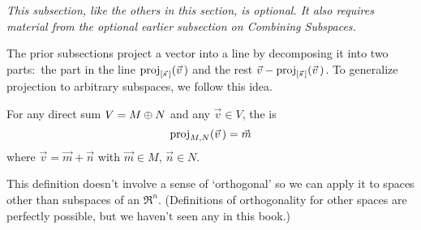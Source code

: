 \noindent\textit{This subsection, like the others in this section,
     is optional.
     It also requires material from the 
     optional earlier subsection on Combining Subspaces.}

The prior subsections
project a vector into a line by decomposing it into two parts:~the
part in the line $\proj{\vec{v}\,}{\spanof{\vec{s}\,}}$ 
and the rest $\vec{v}-\proj{\vec{v}\,}{\spanof{\vec{s}\,}}$.
To generalize projection to arbitrary subspaces, we follow this idea.

\begin{definition}
\label{def:ProjIntoMAlongN}
For any direct sum \( V=M\directsum N \) and any \( \vec{v}\in V \),
the %
is
\begin{equation*}
  \proj{\vec{v}\,}{M,N}=\vec{m}
\end{equation*}
where \( \vec{v}=\vec{m}+\vec{n} \) with \( \vec{m}\in M,\,\vec{n}\in N \).
\end{definition}

This definition doesn't involve a sense of 
`orthogonal' so we can apply it to spaces other than subspaces of 
an $\Re^n$.
(Definitions of orthogonality for other spaces are perfectly possible, but we 
haven't seen any in this book.)

